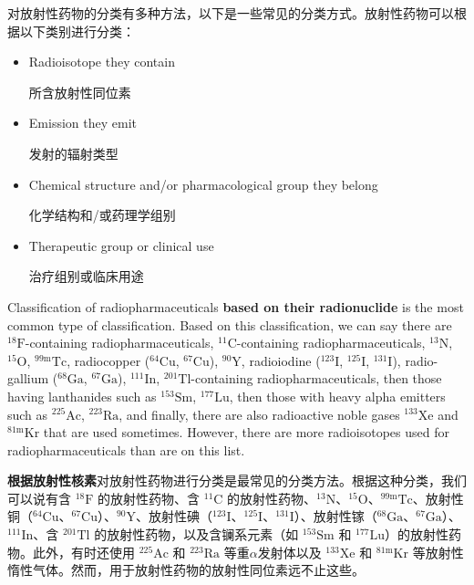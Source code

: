 \documentclass[dvipsnames, svgnames,a4paper,11pt]{article}
\begin{document}
对放射性药物的分类有多种方法，以下是一些常见的分类方式。放射性药物可以根据以下类别进行分类：

\begin{itemize}


      \item Radioisotope they contain

            所含放射性同位素

      \item Emission they emit

            发射的辐射类型

      \item Chemical structure and/or pharmacological group they belong

            化学结构和/或药理学组别

      \item Therapeutic group or clinical use

            治疗组别或临床用途

\end{itemize}

Classification of radiopharmaceuticals \textbf{based on their radionuclide} is the most common type of classification. Based on this classification, we can say there are \(\mathrm{^{18}F}\)-containing radiopharmaceuticals, \(\mathrm{^{11}C}\)-containing radiopharmaceuticals, \(\mathrm{^{13}N}\), \(\mathrm{^{15}O}\), \(\mathrm{^{99m}Tc}\), radiocopper (\(\mathrm{^{64}Cu}\), \(\mathrm{^{67}Cu}\)), \(\mathrm{^{90}Y}\), radioiodine (\(\mathrm{^{123}I}\), \(\mathrm{^{125}I}\), \(\mathrm{^{131}I}\)), radio-gallium (\(\mathrm{^{68}Ga}\), \(\mathrm{^{67}Ga}\)), \(\mathrm{^{111}In}\), \(\mathrm{^{201}Tl}\)-containing radiopharmaceuticals, then those having lanthanides such as \(\mathrm{^{153}Sm}\), \(\mathrm{^{177}Lu}\), then those with heavy alpha emitters such as \(\mathrm{^{225}Ac}\), \(\mathrm{^{223}Ra}\), and finally, there are also radioactive noble gases \(\mathrm{^{133}Xe}\) and \(\mathrm{^{81m}Kr}\) that are used sometimes. However, there are more radioisotopes used for radiopharmaceuticals than are on this list.

\textbf{根据放射性核素}对放射性药物进行分类是最常见的分类方法。根据这种分类，我们可以说有含 ${}^\text{18}\text{F}$ 的放射性药物、含 ${}^\text{11}\text{C}$ 的放射性药物、${}^\text{13}\text{N}$、${}^\text{15}\text{O}$、${}^\text{99m}\text{Tc}$、放射性铜（${}^\text{64}\text{Cu}$、${}^\text{67}\text{Cu}$）、${}^\text{90}\text{Y}$、放射性碘（${}^\text{123}\text{I}$、${}^\text{125}\text{I}$、${}^\text{131}\text{I}$）、放射性镓（${}^\text{68}\text{Ga}$、${}^\text{67}\text{Ga}$）、${}^\text{111}\text{In}$、含 ${}^\text{201}\text{Tl}$ 的放射性药物，以及含镧系元素（如 ${}^\text{153}\text{Sm}$ 和 ${}^\text{177}\text{Lu}$）的放射性药物。此外，有时还使用 ${}^\text{225}\text{Ac}$ 和 ${}^\text{223}\text{Ra}$ 等重$\alpha$发射体以及 ${}^\text{133}\text{Xe}$ 和 ${}^\text{81m}\text{Kr}$ 等放射性惰性气体。然而，用于放射性药物的放射性同位素远不止这些。
\end{document}
